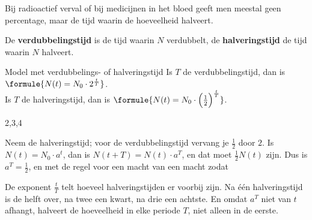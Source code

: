 Bij radioactief verval of bij medicijnen in het bloed geeft men meestal geen percentage, maar de tijd waarin de hoeveelheid halveert.

\begin{theorie}
De \textbf{\textcolor{accent}{verdubbelingstijd}} is de tijd waarin $N$ verdubbelt, de \textbf{\textcolor{accent}{halveringstijd}} de tijd waarin $N$ halveert.

\begin{stelling}{Model met verdubbelings- of halveringstijd}
Is $T$ de verdubbelingstijd, dan is $\formule{N(t) = N_0 \cdot 2^{\frac{t}{T}}}$. \\
Is $T$ de halveringstijd, dan is $\formule{N(t) = N_0 \cdot \Bigl(\frac12\Bigr)^{\frac{t}{T}}}$.
\end{stelling}
\begin{alleenvoor}{2,3,4}
\begin{bewijs}
Neem de halveringstijd; voor de verdubbelingstijd vervang je $\frac12$ door $2$. Is $N(t) = N_0 \cdot a^t$, dan is $N(t + T) = N(t) \cdot a^T$, en dat moet $\frac12 N(t)$ zijn. Dus is $a^T = \frac12$, en met de regel voor een macht van een macht
zodat
\end{bewijs}
\end{alleenvoor}
\end{theorie}

De exponent $\frac{t}{T}$ telt hoeveel halveringstijden er voorbij zijn. Na één halveringstijd is de helft over, na twee een kwart, na drie een achtste. En omdat $a^T$ niet van $t$ afhangt, halveert de hoeveelheid in elke periode $T$, niet alleen in de eerste.


